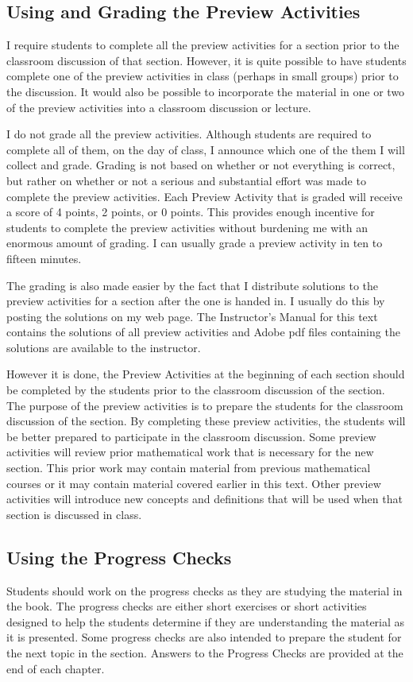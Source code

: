 \subsection*{Using and Grading the Preview Activities}

I require students to complete all the preview activities for a section prior to the classroom discussion of that section.  However, it is quite possible to have students complete one of the preview activities in class (perhaps in small groups) prior to the discussion.  It would also be possible to incorporate the material in one or two of the preview activities into a classroom discussion or lecture.

I do not grade all the preview activities.  Although students are required to complete all of them, on the day of class, I announce which one of the them I will collect and grade.  Grading is not based on whether or not everything is correct, but rather on whether or not a serious and substantial effort was made to complete the preview activities.  Each Preview Activity that is graded will receive a score of 4 points, 2 points, or 0 points.  This provides enough incentive for students to complete the preview activities without burdening me with an enormous amount of grading.  I can usually grade a preview activity in ten to fifteen minutes.  

The grading is also made easier by the fact that I distribute solutions to the preview activities for a section after the one is handed in.  I usually do this by posting the solutions on my web page.  The Instructor's Manual for this text contains the solutions of all preview activities and Adobe pdf files containing the solutions are available to the instructor.

However it is done, the Preview Activities at the beginning of each section should be completed by the students prior to the classroom discussion of the section.  The purpose of the preview activities is to prepare the students for the classroom discussion of the section.  By completing these preview activities, the students will be better prepared to participate in the classroom discussion.  Some preview activities will review prior mathematical work that is necessary for the new section.  This prior work may contain material from previous mathematical courses or it may contain material covered earlier in this text.  Other preview activities will introduce new concepts and definitions that will be used when that section is discussed in class.

\subsection*{Using the Progress Checks}
Students should work on the progress checks as they are studying the material in the book.  The progress checks are either short exercises or short activities designed to help the students determine if they are understanding the material as it is presented.  Some progress checks are also intended to prepare the student for the next topic in the section.  Answers to the Progress Checks are provided at the end of each chapter.

